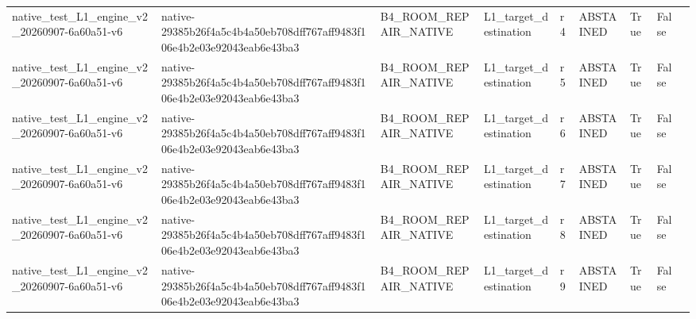 \begin{tabular}{lllllllll}
native\_test\_L1\_engine\_v2\_20260907-6a60a51-v6 & native-29385b26f4a5c4b4a50eb708dff767aff9483f106e4b2e03e92043eab6e43ba3 & B4\_ROOM\_REPAIR\_NATIVE & L1\_target\_destination & r4 & ABSTAINED & True & False &  \\
native\_test\_L1\_engine\_v2\_20260907-6a60a51-v6 & native-29385b26f4a5c4b4a50eb708dff767aff9483f106e4b2e03e92043eab6e43ba3 & B4\_ROOM\_REPAIR\_NATIVE & L1\_target\_destination & r5 & ABSTAINED & True & False &  \\
native\_test\_L1\_engine\_v2\_20260907-6a60a51-v6 & native-29385b26f4a5c4b4a50eb708dff767aff9483f106e4b2e03e92043eab6e43ba3 & B4\_ROOM\_REPAIR\_NATIVE & L1\_target\_destination & r6 & ABSTAINED & True & False &  \\
native\_test\_L1\_engine\_v2\_20260907-6a60a51-v6 & native-29385b26f4a5c4b4a50eb708dff767aff9483f106e4b2e03e92043eab6e43ba3 & B4\_ROOM\_REPAIR\_NATIVE & L1\_target\_destination & r7 & ABSTAINED & True & False &  \\
native\_test\_L1\_engine\_v2\_20260907-6a60a51-v6 & native-29385b26f4a5c4b4a50eb708dff767aff9483f106e4b2e03e92043eab6e43ba3 & B4\_ROOM\_REPAIR\_NATIVE & L1\_target\_destination & r8 & ABSTAINED & True & False &  \\
native\_test\_L1\_engine\_v2\_20260907-6a60a51-v6 & native-29385b26f4a5c4b4a50eb708dff767aff9483f106e4b2e03e92043eab6e43ba3 & B4\_ROOM\_REPAIR\_NATIVE & L1\_target\_destination & r9 & ABSTAINED & True & False &  \\
\end{tabular}
